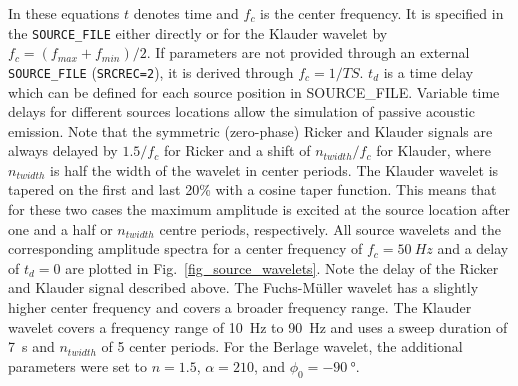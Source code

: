 In these equations $t$ denotes time and $f_c$ is the center frequency. It is specified in the \texttt{SOURCE\_FILE} either directly or for the Klauder wavelet by $f_c=(f_{max}+f_{min})/2$. If parameters are not provided through an external \texttt{SOURCE\_FILE} (\texttt{SRCREC=2}), it is derived through $f_c=1/TS$. $t_d$ is a time delay which can be defined for each source position in SOURCE\_FILE. Variable time delays for different sources locations allow the simulation of passive acoustic emission. Note that the symmetric (zero-phase) Ricker and Klauder signals are always delayed by $1.5/f_c$ for Ricker and a shift of $n_{twidth}/f_c$ for Klauder, where $n_{twidth}$ is half the width of the wavelet in center periods. The Klauder wavelet is tapered on the first and last 20\% with a cosine taper function. This means that for these two cases the maximum amplitude is excited at the source location after one and a half or $n_{twidth}$ centre periods, respectively. All source wavelets and the corresponding amplitude spectra for a center frequency of $f_c=\SI{50}{Hz}$ and a delay of $t_d=0$ are plotted in Fig.~\ref{fig_source_wavelets}. Note the delay of the Ricker and Klauder signal described above. The  Fuchs-M\"uller wavelet has a slightly higher center frequency and covers a broader frequency range. The Klauder wavelet covers a frequency range of \SI{10}{Hz} to \SI{90}{Hz} and uses a sweep duration of \SI{7}{s} and $n_{twidth}$ of 5 center periods. For the Berlage wavelet, the additional parameters were set to $n=1.5$, $\alpha=210$, and $\phi_0=\SI{-90}{\degree}$.

